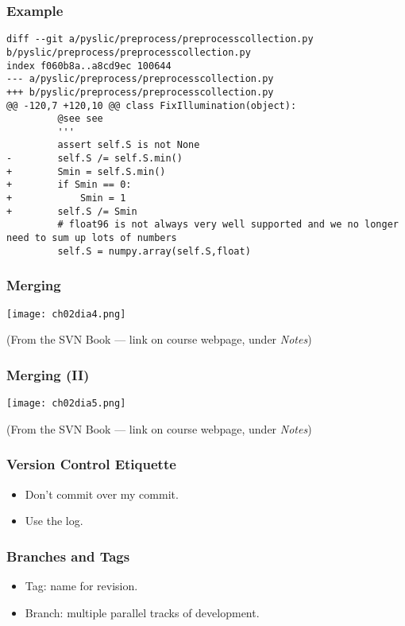 \begin{frame}[fragile]
\frametitle{Example}

\begin{verbatim}
diff --git a/pyslic/preprocess/preprocesscollection.py b/pyslic/preprocess/preprocesscollection.py
index f060b8a..a8cd9ec 100644
--- a/pyslic/preprocess/preprocesscollection.py
+++ b/pyslic/preprocess/preprocesscollection.py
@@ -120,7 +120,10 @@ class FixIllumination(object):
         @see see
         '''
         assert self.S is not None
-        self.S /= self.S.min()
+        Smin = self.S.min()
+        if Smin == 0:
+            Smin = 1
+        self.S /= Smin
         # float96 is not always very well supported and we no longer need to sum up lots of numbers
         self.S = numpy.array(self.S,float)
\end{verbatim}

\end{frame}

\begin{frame}[fragile]
\frametitle{Merging}

\centering
\texttt{[image: ch02dia4.png]}

\begin{flushright}
(From the SVN Book --- link on course webpage, under \textit{Notes})
\end{flushright}

\end{frame}

\begin{frame}[fragile]
\frametitle{Merging (II)}

\centering
\texttt{[image: ch02dia5.png]}

\begin{flushright}
(From the SVN Book --- link on course webpage, under \textit{Notes})
\end{flushright}

\end{frame}

\begin{frame}[fragile]
\frametitle{Version Control Etiquette}
\begin{itemize}
\item Don't commit over my commit.
\item Use the log.
\end{itemize}
\end{frame}

\begin{frame}[fragile]
\frametitle{Branches and Tags}
\begin{itemize}
\item Tag: name for revision.
\item Branch: multiple parallel tracks of development.
\end{itemize}

\end{frame}


